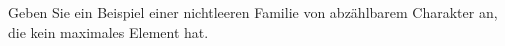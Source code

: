 
\begin{exercise}[279]

Geben Sie ein Beispiel einer nichtleeren Familie von abzählbarem Charakter an,
die kein maximales Element hat.

\end{exercise}


\begin{solution}

\phantom{}

\end{solution}

